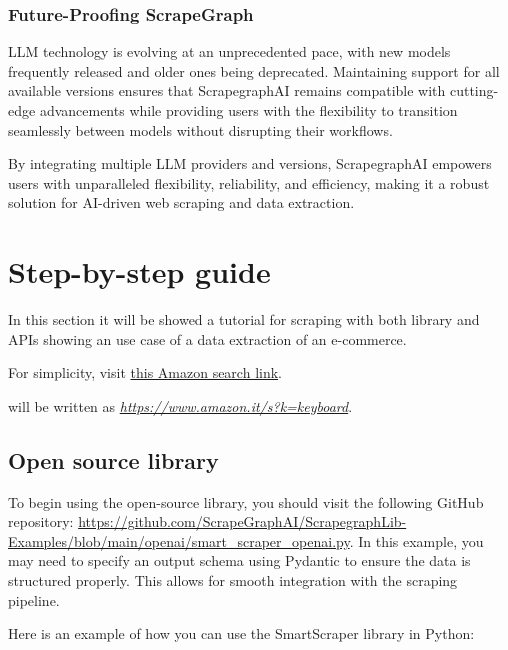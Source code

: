\subsubsection{Future-Proofing ScrapeGraph}

LLM technology is evolving at an unprecedented pace, with new models frequently released and older ones being deprecated. Maintaining support for all available versions ensures that ScrapegraphAI remains compatible with cutting-edge advancements while providing users with the flexibility to transition seamlessly between models without disrupting their workflows.

By integrating multiple LLM providers and versions, ScrapegraphAI empowers users with unparalleled flexibility, reliability, and efficiency, making it a robust solution for AI-driven web scraping and data extraction.


\section{Step-by-step guide}
In this section it will be showed a tutorial for scraping with both library and APIs showing an use case of a data extraction of an e-commerce.

For simplicity, visit \href{https://www.amazon.it/s?k=keyboard&__mk_it_IT=%C3%85%C3%85%C5%BD%C3%95%C3%91&crid=2NTE6199MWOQE&sprefix=keyboar%2Caps%2C114&ref=nb_sb_noss_2V}{this Amazon search link}.

will be written as \textit{\url{https://www.amazon.it/s?k=keyboard}}.

\subsection{Open source library}

To begin using the open-source library, you should visit the following GitHub repository: \url{https://github.com/ScrapeGraphAI/ScrapegraphLib-Examples/blob/main/openai/smart_scraper_openai.py}. In this example, you may need to specify an output schema using Pydantic to ensure the data is structured properly. This allows for smooth integration with the scraping pipeline.

Here is an example of how you can use the SmartScraper library in Python:

